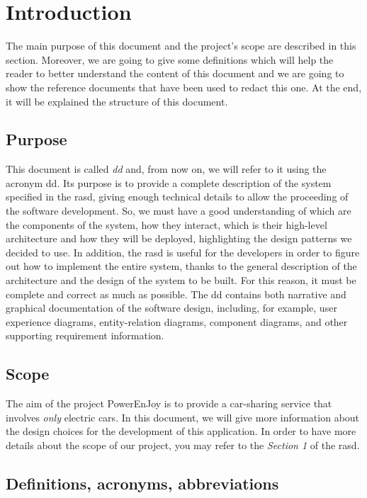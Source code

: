 \section{Introduction} \label{sec:intro}

The main purpose of this document and the project's scope are described in this section. Moreover, we are going to give some definitions which will help the reader to better understand the content of this document and we are going to show the reference documents that have been used to redact this one. At the end, it will be explained the structure of this document.

\subsection{Purpose} \label{subsec:purpose}

This document is called \emph{\acl{dd}} and, from now on, we will refer to it using the acronym \acs{dd}. Its purpose is to provide a complete description of the system specified in the \acs{rasd}, giving enough technical details to allow the proceeding of the software development. So, we must have a good understanding of which are the components of the system, how they interact, which is their high-level architecture and how they will be deployed, highlighting the design patterns we decided to use.
In addition, the \acs{rasd} is useful for the developers in order to figure out how to implement the entire system, thanks to the general description of the architecture and the design of the system to be built. For this reason, it must be complete and correct as much as possible.
The \acs{dd} contains both narrative and graphical documentation of the software design, including, for example, user experience diagrams, entity-relation diagrams, component diagrams, and other supporting requirement information.

\subsection{Scope} \label{subsec:scope}
The aim of the project PowerEnJoy is to provide a car-sharing service that involves \textit{only} electric cars. In this document, we will give more information about the design choices for the development of this application.
In order to have more details about the scope of our project, you may refer to the \textit{Section 1} of the \acl{rasd}.

\subsection{Definitions, acronyms, abbreviations} 
\label{subsec:def-ac}
